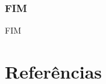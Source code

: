 \documentclass[]{beamer}
\begin{document}


\begin{frame}
 \frametitle{FIM}
   FIM%
\end{frame}

\section{Referências}



\end{document}
